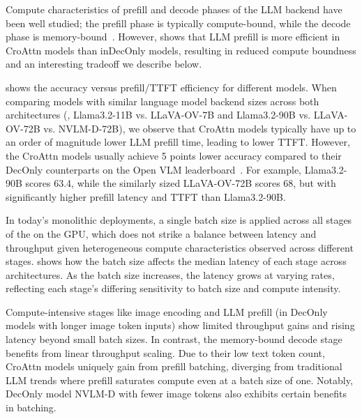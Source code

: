 Compute characteristics of prefill and decode phases of the LLM backend have been well studied;
the prefill phase is typically compute-bound, while the decode phase is memory-bound~\cite{patel2024splitwise,sarathi-serve,pod-attention}.
However,  shows that LLM prefill is more efficient in CroAttn models than inDecOnly models, resulting in reduced compute boundness and an interesting tradeoff we describe below.

 shows the accuracy versus prefill/TTFT efficiency for different models.
When comparing models with similar language model backend sizes across both architectures (\eg{}, Llama3.2-11B vs. LLaVA-OV-7B and Llama3.2-90B vs. LLaVA-OV-72B vs. NVLM-D-72B), we observe that CroAttn models typically have up to an order of magnitude lower LLM prefill time, leading to lower TTFT.
However, the CroAttn models usually achieve 5 points lower accuracy compared to their DecOnly counterparts on the Open VLM leaderboard~\cite{vlm-leaderboard}.
For example, Llama3.2-90B scores 63.4, while the similarly sized LLaVA-OV-72B scores 68, but with significantly higher prefill latency and TTFT than Llama3.2-90B.



\label{insight:3}



In today’s monolithic deployments, a single batch size is applied across all stages of the \lmm{} on the GPU, which does not strike a balance between latency and throughput given heterogeneous compute characteristics observed across different stages.
 shows how the batch size affects the median latency of each \lmm{} stage across architectures.
As the batch size increases, the latency grows at varying rates, reflecting each stage's differing sensitivity to batch size and compute intensity.

Compute-intensive stages like image encoding and LLM prefill (in DecOnly models with longer image token inputs) show limited throughput gains and rising latency beyond small batch sizes.
In contrast, the memory-bound decode stage benefits from linear throughput scaling.
Due to their low text token count, CroAttn models uniquely gain from prefill batching, diverging from traditional LLM trends where prefill saturates compute even at a batch size of one.
Notably, DecOnly model NVLM-D with fewer image tokens also exhibits certain benefits in batching.

